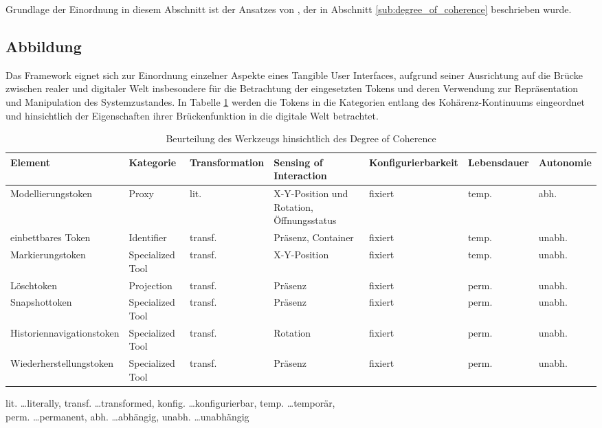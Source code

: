 Grundlage der Einordnung in diesem Abschnitt ist der Ansatzes von \citep{Koleva03}, der in Abschnitt \ref{sub:degree_of_coherence} beschrieben wurde.

\subsection{Abbildung} %
\label{sub:abbildung}

Das Framework eignet sich zur Einordnung einzelner Aspekte eines Tangible User Interfaces, aufgrund seiner Ausrichtung auf die Brücke zwischen realer und digitaler Welt insbesondere für die Betrachtung der eingesetzten Tokens und deren Verwendung zur Repräsentation und Manipulation des Systemzustandes. In Tabelle \ref{tab:degree_of_coherence} werden die Tokens in die Kategorien entlang des Kohärenz-Kontinuums eingeordnet und hinsichtlich der Eigenschaften ihrer Brückenfunktion in die digitale Welt betrachtet. 

\begin{table}[htbp]
	\centering
	\caption{Beurteilung des Werkzeugs hinsichtlich des Degree of Coherence}
	\begin{tabular}{| p{2cm} || p{2cm} | p{} | p{} | p{} | p{} | p{} |} \hline
		Element & Kategorie & Trans\-for\-mation & Sensing of Inter\-action & Konfig\-urierbar\-keit & Lebens\-dauer & Auto\-nomie \\ \hline \hline
		Modell\-ierungs\-token  & Proxy & lit. & X-Y-Position und Rotation, Öffnungsstatus & fixiert & temp. & abh. \\ \hline
		einbett\-bares Token & Identifier & transf. & Präsenz, Container & fixiert & temp. & unabh. \\ \hline
		Mark\-ierungs\-token & Specialized Tool & transf. & X-Y-Position & fixiert & temp. & unabh. \\ \hline
		Löschtoken & Projection & transf. & Präsenz & fixiert & perm. & unabh. \\ \hline
		Snapshot\-token & Specialized Tool & transf. & Präsenz & fixiert & perm. & unabh. \\ \hline
		Historien\-navigations\-token & Specialized Tool & transf. & Rotation & fixiert & perm. & unabh. \\ \hline
		Wieder\-herstellungs\-token & Specialized Tool & transf. & Präsenz & fixiert & perm. & unabh. \\ \hline
	\end{tabular}
	\footnotesize lit. \ldots literally, transf. \ldots transformed, konfig. \ldots konfigurierbar, temp. \ldots temporär,\\ perm. \ldots permanent, abh. \ldots abhängig, unabh. \ldots unabhängig
	\label{tab:degree_of_coherence}
\end{table}

